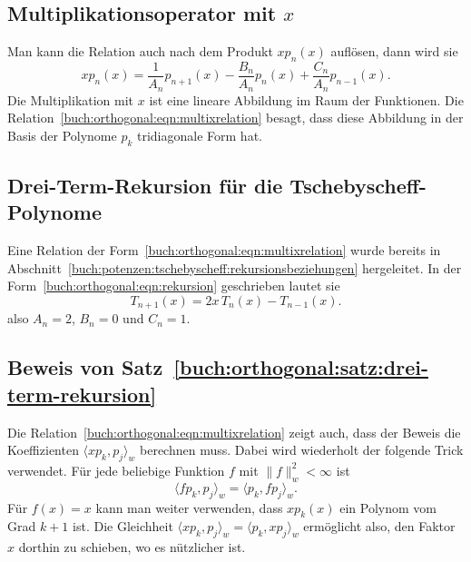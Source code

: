 \subsection{Multiplikationsoperator mit $x$}
Man kann die Relation auch nach dem Produkt $xp_n(x)$ auflösen, dann
wird sie
\begin{equation}
xp_n(x)
=
\frac{1}{A_n}p_{n+1}(x)
-
\frac{B_n}{A_n}p_n(x)
+
\frac{C_n}{A_n}p_{n-1}(x).
\label{buch:orthogonal:eqn:multixrelation}
\end{equation}
Die Multiplikation mit $x$ ist eine lineare Abbildung im Raum der Funktionen.
Die Relation~\eqref{buch:orthogonal:eqn:multixrelation} besagt, dass diese
Abbildung in der Basis der Polynome $p_k$ tridiagonale Form hat.

\subsection{Drei-Term-Rekursion für die Tschebyscheff-Polynome}
Eine Relation der Form~\eqref{buch:orthogonal:eqn:multixrelation}
wurde bereits in 
Abschnitt~\ref{buch:potenzen:tschebyscheff:rekursionsbeziehungen}
hergeleitet.
In der Form~\eqref{buch:orthogonal:eqn:rekursion} geschrieben lautet
sie
\[
T_{n+1}(x) = 2x\,T_n(x)-T_{n-1}(x).
\]
also
$A_n=2$, $B_n=0$ und $C_n=1$.

\subsection{Beweis von Satz~\ref{buch:orthogonal:satz:drei-term-rekursion}}
Die Relation~\eqref{buch:orthogonal:eqn:multixrelation} zeigt auch,
dass der Beweis die Koeffizienten $\langle xp_k,p_j\rangle_w$
berechnen muss.
Dabei wird wiederholt der folgende Trick verwendet.
Für jede beliebige Funktion $f$ mit $\|f\|_w^2<\infty$ ist
\[
\langle fp_k,p_j\rangle_w
=
\langle p_k,fp_j\rangle_w.
\]
Für $f(x)=x$ kann man weiter verwenden, dass $xp_k(x)$ ein Polynom
vom Grad $k+1$ ist.
Die Gleichheit $\langle xp_k,p_j\rangle_w=\langle p_k,xp_j\rangle_w$
ermöglicht also, den Faktor $x$ dorthin zu schieben, wo es nützlicher ist.

